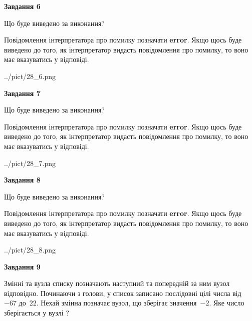 \documentclass[12pt, ukrainian]{article}
\begin{document}
{\begin {large}
{\begin {center}\textbf{Завдання 6}\end {center}}\par
Що буде виведено за виконання?

Повідомлення інтерпретатора про помилку позначати \textbf{error}.
Якщо щось буде виведено до того, як інтерпретатор видасть повідомлення про помилку, 
то воно має вказуватись у відповіді. \par


\begin{center}
	{../pict/28_6.png}
\end{center}
\newpage

{\begin {center}\textbf{Завдання 7}\end {center}}\par
Що буде виведено за виконання?

Повідомлення інтерпретатора про помилку позначати \textbf{error}.
Якщо щось буде виведено до того, як інтерпретатор видасть повідомлення про помилку, 
то воно має вказуватись у відповіді. \par


\begin{center}
	{../pict/28_7.png}
\end{center}
\newpage

{\begin {center}\textbf{Завдання 8}\end {center}}\par
Що буде виведено за виконання?

Повідомлення інтерпретатора про помилку позначати \textbf{error}.
Якщо щось буде виведено до того, як інтерпретатор видасть повідомлення про помилку, 
то воно має вказуватись у відповіді. \par


\begin{center}
	{../pict/28_8.png}
\end{center}
\newpage

{\begin {center}\textbf{Завдання 9}\end {center}}\par
Змінні  та  вузла списку позначають наступний та попередній за ним вузол відповідно. Починаючи з голови, у список записано послідовні цілі числа від~$-67$ до~$22$. Нехай змінна  позначає вузол, що зберігає значення~$-2$.
Яке число зберігається у вузлі  ?\par
\newpage


\end{large}}
\end{document}
